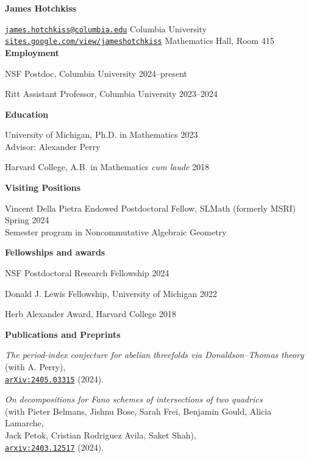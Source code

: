 \documentclass[11 pt]{letter}
\begin{document}
	\noindent
	\begin{center}
	 	\textbf{\Large James Hotchkiss}
	 \end{center} 
	\hrulefill 

	\noindent \href{mailto:james.hotchkiss@columbia.edu}{\nolinkurl{james.hotchkiss@columbia.edu}} \hfill Columbia University \\
	\href{https://sites.google.com/view/jameshotchkiss/james-hotchkiss}{\nolinkurl{sites.google.com/view/jameshotchkiss}}  \hfill Mathematics Hall, Room 415 \\



	\noindent
	\textbf{\large{Employment}}

	NSF Postdoc, Columbia University \hfill 2024--present

	Ritt Assistant Professor, Columbia University \hfill 2023--2024


	\noindent
	\textbf{\large{Education}}

	University of Michigan, Ph.D. in Mathematics \hfill 2023 \\
	\indent Advisor: Alexander Perry

	Harvard College, A.B. in Mathematics \textit{cum laude} \hfill 2018

	\noindent
	\textbf{\large{Visiting Positions}}

	Vincent Della Pietra Endowed Postdoctoral Fellow, SLMath (formerly MSRI) \hfill Spring 2024 \\
	\indent Semester program in Noncommutative Algebraic Geometry

	\medskip
	\noindent
	\textbf{\large{Fellowships and awards}}

	NSF Postdoctoral Research Fellowship \hfill 2024

	Donald J. Lewis Fellowship, University of Michigan \hfill 2022 

	Herb Alexander Award, Harvard College \hfill 2018


	\medskip
	\noindent
	\textbf{\large{Publications and Preprints}}

	\emph{The period-index conjecture for abelian threefolds via Donaldson--Thomas theory} \\ \indent (with A. Perry), \\
	\indent \href{https://arxiv.org/abs/2405.03315}{\nolinkurl{arXiv:2405.03315}} (2024).

	\emph{On decompositions for Fano schemes of intersections of two quadrics} \\ 
	\indent (with Pieter Belmans, Jishnu Bose, Sarah Frei, Benjamin Gould, Alicia Lamarche, \\
	\indent Jack Petok, Cristian Rodriguez Avila, Saket Shah), \\
	\indent \href{https://arxiv.org/abs/2403.12517}{\nolinkurl{arxiv:2403.12517}} (2024).
\end{document}
